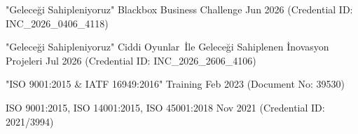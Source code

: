 
\vspace{-3mm}

\begin{cventries}

  \cventry
    {"Geleceği Sahipleniyoruz" Blackbox Business Challenge\texttrademark} %
    {} %
    {} %
    {Jun 2026} %
    {\scriptsize\color{lighttext}(Credential ID: INC\_2026\_0406\_4118)}

  \cventry
    {"Geleceği Sahipleniyoruz" Ciddi Oyunlar\texttrademark\ İle Geleceği Sahiplenen İnovasyon Projeleri} %
    {} %
    {} %
    {Jul 2026} %
    {\scriptsize\color{lighttext}(Credential ID: INC\_2026\_2606\_4106)}

\end{cventries}

\vspace{-3mm}

\begin{cventries}

  \cventry
    {"ISO 9001:2015 \& IATF 16949:2016" Training} %
    {} %
    {} %
    {Feb 2023} %
    {\scriptsize\color{lighttext}(Document No: 39530)}

\end{cventries}

\vspace{-3mm}

\begin{cventries}

  \cventry
    {ISO 9001:2015, ISO 14001:2015, ISO 45001:2018} %
    {} %
    {} %
    {Nov 2021} %
    {\scriptsize\color{lighttext}(Credential ID: 2021/3994)}

\end{cventries}

